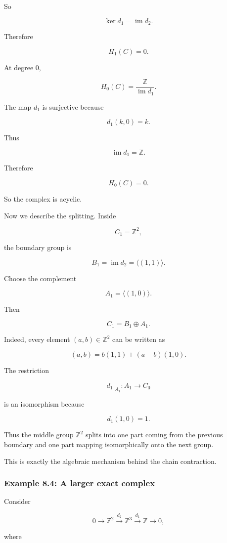 \documentclass[12pt,a4paper]{article}
\theoremstyle{notespace}
\begin{document}
So

\[
\ker d_1=\operatorname{im}d_2.
\]

Therefore

\[
H_1(C)=0.
\]

At degree \(0\),

\[
H_0(C)=\frac{\mathbb Z}{\operatorname{im}d_1}.
\]

The map \(d_1\) is surjective because

\[
d_1(k,0)=k.
\]

Thus

\[
\operatorname{im}d_1=\mathbb Z.
\]

Therefore

\[
H_0(C)=0.
\]

So the complex is acyclic.

Now we describe the splitting. Inside

\[
C_1=\mathbb Z^2,
\]

the boundary group is

\[
B_1=\operatorname{im}d_2
=
\langle (1,1)\rangle.
\]

Choose the complement

\[
A_1=\langle (1,0)\rangle.
\]

Then

\[
C_1=B_1\oplus A_1.
\]

Indeed, every element \((a,b)\in \mathbb Z^2\) can be written as

\[
(a,b)=b(1,1)+(a-b)(1,0).
\]

The restriction

\[
d_1|_{A_1}\colon A_1\to C_0
\]

is an isomorphism because

\[
d_1(1,0)=1.
\]

Thus the middle group \(\mathbb Z^2\) splits into one part coming from the previous boundary and one part mapping isomorphically onto the next group.

This is exactly the algebraic mechanism behind the chain contraction.

\subsubsection{Example 8.4: A larger exact complex}

Consider

\[
0\longrightarrow \mathbb Z^2
\xrightarrow{d_2}
\mathbb Z^3
\xrightarrow{d_1}
\mathbb Z
\longrightarrow 0,
\]

where
\end{document}
